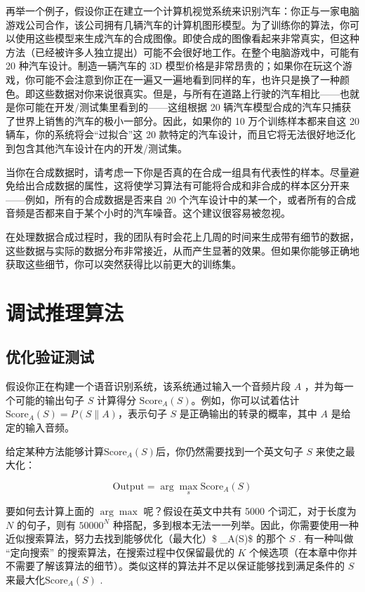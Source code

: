 再举一个例子，假设你正在建立一个计算机视觉系统来识别汽车：你正与一家电脑游戏公司合作，该公司拥有几辆汽车的计算机图形模型。为了训练你的算法，你可以使用这些模型来生成汽车的合成图像。即使合成的图像看起来非常真实，但这种方法（已经被许多人独立提出）可能不会很好地工作。在整个电脑游戏中，可能有
20 种汽车设计。制造一辆汽车的 3D
模型价格是非常昂贵的；如果你在玩这个游戏，你可能不会注意到你正在一遍又一遍地看到同样的车，也许只是换了一种颜色。即这些数据对你来说很真实。但是，与所有在道路上行驶的汽车相比------也就是你可能在开发/测试集里看到的------这组根据
20
辆汽车模型合成的汽车只捕获了世界上销售的汽车的极小一部分。因此，如果你的
10 万个训练样本都来自这 20 辆车，你的系统将会``过拟合''这 20
款特定的汽车设计，而且它将无法很好地泛化到包含其他汽车设计在内的开发/测试集。

当你在合成数据时，请考虑一下你是否真的在合成一组具有代表性的样本。尽量避免给出合成数据的属性，这将使学习算法有可能将合成和非合成的样本区分开来------例如，所有的合成数据是否来自
20
个汽车设计中的某一个，或者所有的合成音频是否都来自于某个小时的汽车噪音。这个建议很容易被忽视。

在处理数据合成过程时，我的团队有时会花上几周的时间来生成带有细节的数据，这些数据与实际的数据分布非常接近，从而产生显著的效果。但如果你能够正确地获取这些细节，你可以突然获得比以前更大的训练集。

\hypertarget{ux8c03ux8bd5ux63a8ux7406ux7b97ux6cd5}{%
\part{调试推理算法}\label{ux8c03ux8bd5ux63a8ux7406ux7b97ux6cd5}}

\hypertarget{ux4f18ux5316ux9a8cux8bc1ux6d4bux8bd5}{%
\chapter{优化验证测试}\label{ux4f18ux5316ux9a8cux8bc1ux6d4bux8bd5}}

假设你正在构建一个语音识别系统，该系统通过输入一个音频片段 \(A​\)
，并为每一个可能的输出句子 \(S​\) 计算得分
\(\text{Score}_A(S)​\)。例如，你可以试着估计\(\text{Score}_A(S)=P(S\|A)​\)，表示句子
\(S​\) 是正确输出的转录的概率，其中 \(A​\) 是给定的输入音频。

给定某种方法能够计算\(\text {Score}_A(S)\)后，你仍然需要找到一个英文句子
\(S\) 来使之最大化：

\[
\text{Output} = \arg \max_s \text{Score}_A(S)
\]

要如何去计算上面的 \(\arg \max\) 呢？假设在英文中共有 5000
个词汇，对于长度为 \(N\) 的句子，则有 \(50000^N\)
种搭配，多到根本无法一一列举。因此，你需要使用一种近似搜索算法，努力去找到能够优化（最大化）\$
\_A(S)\$ 的那个 \(S\) . 有一种叫做 ``定向搜索''
的搜索算法，在搜索过程中仅保留最优的 \(K\)
个候选项（在本章中你并不需要了解该算法的细节）。类似这样的算法并不足以保证能够找到满足条件的
\(S\) 来最大化\(\text{Score}_A(S)\) .


